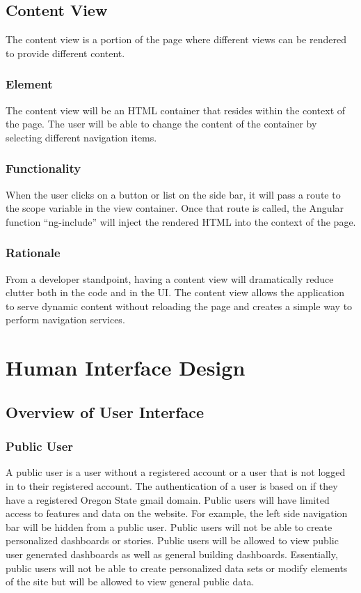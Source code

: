 \documentclass[journal,10pt,onecolumn,compsoc]{IEEEtran}
\begin{document}
	\subsection{Content View}
	The content view is a portion of the page where different views can be rendered to provide different content.
    \subsubsection{Element} 
	The content view will be an HTML container that resides within the context of the page. The user will be able to change the content of the container by selecting different navigation items.
    \subsubsection{Functionality}
	When the user clicks on a button or list on the side bar, it will pass a route to the scope variable in the view container. Once that route is called, the Angular function ``ng-include'' will inject the rendered HTML into the context of the page.
    \subsubsection{Rationale} 
	From a developer standpoint, having a content view will dramatically reduce clutter both in the code and in the UI. The content view allows the application to serve dynamic content without reloading the page and creates a simple way to perform navigation services.

	\section{Human Interface Design}
    \subsection{Overview of User Interface}
    \iffalse
    Describe the functionality of the system from the user’s perspective. Explain how the
    user will be able to use your system to complete all the expected features and the
    feedback information that will be displayed for the user.
    \fi
	\subsubsection{Public User}
	A public user is a user without a registered account or a user that is not logged in to their registered account. The authentication of a user is based on if 
	they have a registered Oregon State gmail domain. Public users will have limited access to features and data on the website. For example, the left side navigation
	bar will be hidden from a public user. Public users will not be able to create personalized dashboards or stories. Public users will be allowed to view public 
	user generated dashboards as well as general building dashboards. Essentially, public users will not be able to create personalized data sets or modify elements of the site but will be 
	allowed to view general public data. 
\end{document}

